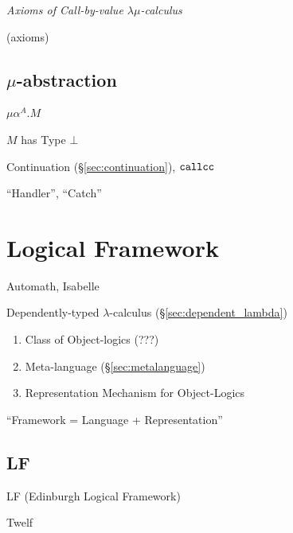 \emph{Axioms of Call-by-value $\lambda\mu$-calculus}

(axioms) %




\subsection{$\mu$-abstraction}\label{sec:mu_abstraction}

$\mu\alpha^A.M$

$M$ has Type $\bot$

Continuation (\S\ref{sec:continuation}), $\mathtt{callcc}$

``Handler'', ``Catch'' %



\section{Logical Framework}\label{sec:logical_framework}


Automath, Isabelle

Dependently-typed $\lambda$-calculus (\S\ref{sec:dependent_lambda})

\begin{enumerate}
  \item Class of Object-logics (???)
  \item Meta-language (\S\ref{sec:metalanguage})
  \item Representation Mechanism for Object-Logics
\end{enumerate}

``Framework = Language + Representation''



\subsection{LF}\label{sec:lf}

LF (Edinburgh Logical Framework)

Twelf


